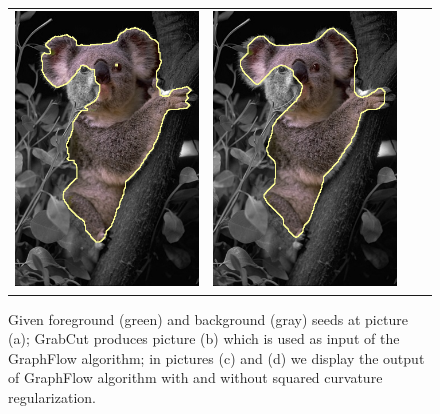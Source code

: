 \begin{figure}
\begin{tabular}{cccc}
 	\includegraphics[scale=0.25]{figures/chapter8/segmentation/coala/k-0.0/corrected-seg.png} &  	
 	\includegraphics[scale=0.25]{figures/chapter8/segmentation/coala/k-0.5/corrected-seg.png}
\end{tabular}	
\caption{Given foreground (green) and background (gray) seeds at picture (a); GrabCut produces picture (b) which is used as input of the GraphFlow algorithm; in pictures (c) and (d) we display the output of GraphFlow algorithm with and without squared curvature regularization. }
\label{fig:ch8-segmentation}
\end{figure}

